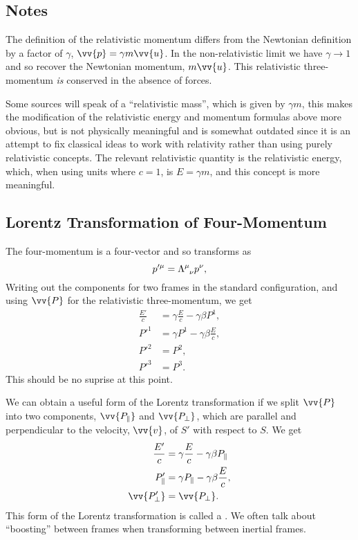 \documentclass[fleqn]{NotesClass}
\begin{document}
    \subsection{Notes}
    The definition of the relativistic momentum differs from the Newtonian definition by a factor of \(\gamma\), \(\vv{p} = \gamma m\vv{u}\).
    In the non-relativistic limit we have \(\gamma \to 1\) and so recover the Newtonian momentum, \(m\vv{u}\).
    This relativistic three-momentum \emph{is} conserved in the absence of forces.
    
    Some sources will speak of a \enquote{relativistic mass}, which is given by \(\gamma m\), this makes the modification of the relativistic energy and momentum formulas above more obvious, but is not physically meaningful and is somewhat outdated since it is an attempt to fix classical ideas to work with relativity rather than using purely relativistic concepts.
    The relevant relativistic quantity is the relativistic energy, which, when using units where \(c = 1\), is \(E = \gamma m\), and this concept is more meaningful.
    
    \subsection{Lorentz Transformation of Four-Momentum}
    The four-momentum is a four-vector and so transforms as
    \begin{equation}
        p'^\mu = \tensor{\Lambda}{^\mu_\nu}p^\nu,
    \end{equation}
    Writing out the components for two frames in the standard configuration, and using \(\vv{P}\) for the relativistic three-momentum, we get
    \begin{align}
        \frac{E'}{c} &= \gamma\frac{E}{c} - \gamma \beta P^1,\\
        P'^1 &= \gamma P^1 - \gamma\beta \frac{E}{c},\\
        P'^2 &= P^2,\\
        P'^3 &= P^3.
    \end{align}
    This should be no suprise at this point.
    
    We can obtain a useful form of the Lorentz transformation if we split \(\vv{P}\) into two components, \(\vv{P_{\parallel}}\) and \(\vv{P_{\perp}}\), which are parallel and perpendicular to the velocity, \(\vv{v}\), of \(S'\) with respect to \(S\).
    We get
    \begin{align}
        \frac{E'}{c} &= \gamma\frac{E}{c} - \gamma\beta P_{\parallel}\\
        P'_{\parallel} &= \gamma P_{\parallel} - \gamma\beta\frac{E}{c},\\
        \vv{P_{\perp}'} &= \vv{P_{\perp}}.
    \end{align}
    This form of the Lorentz transformation is called a .
    We often talk about \enquote{boosting} between frames when transforming between inertial frames.
    
\end{document}
